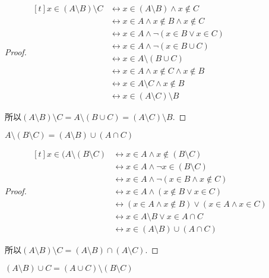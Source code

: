 \begin{proof}
	$\begin{aligned}[t]
		x\in (A\setminus B)\setminus C & \leftrightarrow x\in (A\setminus B)\wedge x\notin C \\
		& \leftrightarrow x\in A\wedge x\notin B\wedge x\notin C \\
		& \leftrightarrow x\in A\wedge \neg (x\in B\vee x\in C) \\
		& \leftrightarrow x\in A\wedge \neg (x\in B\cup C) \\
		& \leftrightarrow x\in A\setminus (B\cup C) \\
		& \leftrightarrow x\in A\wedge x\notin C\wedge x\notin B \\
		& \leftrightarrow x\in A\setminus C\wedge x\notin B \\
		& \leftrightarrow x\in (A\setminus C)\setminus B
	\end{aligned}$
	
	所以$(A\setminus B)\setminus C=A\setminus (B\cup C)=(A\setminus C)\setminus B$.
\end{proof}

\begin{proposition}
	$A\setminus (B\setminus C)=(A\setminus B)\cup (A\cap C)$
\end{proposition}

\begin{proof}
	$\begin{aligned}[t]
		x\in (A\setminus (B\setminus C) & \leftrightarrow x\in A\wedge x\notin(B\setminus C) \\
		& \leftrightarrow x\in A\wedge \neg x\in(B\setminus C) \\
		& \leftrightarrow x\in A\wedge \neg (x\in B\wedge x\notin C) \\
		& \leftrightarrow x\in A\wedge (x\notin B\vee x\in C) \\
		& \leftrightarrow (x\in A\wedge x\notin B)\vee (x\in A\wedge x\in C) \\
		& \leftrightarrow x\in A\setminus B\vee x\in A\cap C \\
		& \leftrightarrow x\in (A\setminus B)\cup (A\cap C)
	\end{aligned}$
	
	所以$(A\setminus B)\setminus C=(A\setminus B)\cap (A\setminus C)$.
\end{proof}

\begin{proposition}
	$(A\setminus B)\cup C=(A\cup C)\setminus (B\setminus C)$
\end{proposition}

